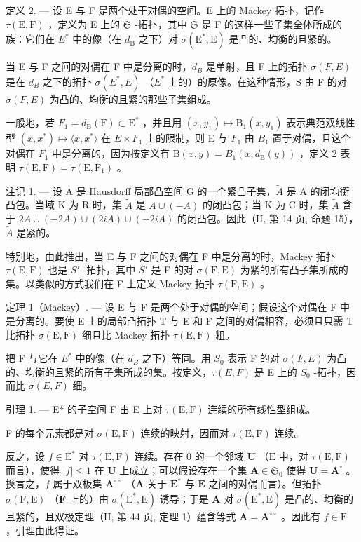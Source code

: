 定义 2. --- 设 E 与 F 是两个处于对偶的空间。E 上的 Mackey 拓扑，记作 \(\tau(\mathrm{E},\mathrm{F})\) ，定义为 E 上的 \(\mathfrak{S}\) -拓扑，其中 \(\mathfrak{S}\) 是 F 的这样一些子集全体所成的族：它们在 \(E^{*}\) 中的像（在 \(d_{\mathrm{B}}\) 之下）对 \(\sigma(\mathrm{E}^{*},\mathrm{E})\) 是凸的、均衡的且紧的。

当 E 与 F 之间的对偶在 F 中是分离的时，\(d_{B}\) 是单射，且 F 上的拓扑 \(\sigma(F, E)\) 是在 \(d_{B}\) 之下的拓扑 \(\sigma(E^{*}, E)\) （\(E^{*}\) 上的）的原像。在这种情形，S 由 F 的对 \(\sigma(F, E)\) 为凸的、均衡的且紧的那些子集组成。

一般地，若 \(F_{1}=d_{\mathrm{B}}(\mathrm{F})\subset\mathrm{E}^{*}\) ，并且用 \((x,y_{1})\mapsto\mathrm{B}_{1}(x,y_{1})\) 表示典范双线性型 \((x,x^{*})\mapsto\langle x,x^{*}\rangle\) 在 \(E\times F_{1}\) 上的限制，则 E 与 \(F_{1}\) 由 \(B_{1}\) 置于对偶，且这个对偶在 \(F_{1}\) 中是分离的，因为按定义有 \(\mathrm{B}(x,y)=B_{1}(x,d_{\mathrm{B}}(y))\) ，定义 2 表明 \(\tau(\mathrm{E},\mathrm{F})=\tau(\mathrm{E},\mathrm{F}_{1})\) 。

注记 1. --- 设 A 是 Hausdorff 局部凸空间 G 的一个紧凸子集，\(\tilde{A}\) 是 A 的闭均衡凸包。当域 K 为 R 时，集 \(\tilde{A}\) 是 \(A \cup (-A)\) 的闭凸包；当 K 为 C 时，集 \(\tilde{A}\) 含于 \(2A \cup (-2A) \cup (2iA) \cup (-2iA)\) 的闭凸包。因此（II, 第 14 页, 命题 15），\(\tilde{A}\) 是紧的。

特别地，由此推出，当 E 与 F 之间的对偶在 F 中是分离的时，Mackey 拓扑 \(\tau(\mathrm{E},\mathrm{F})\) 也是 \(S'\) -拓扑，其中 \(S'\) 是 F 的对 \(\sigma(\mathrm{F},\mathrm{E})\) 为紧的所有凸子集所成的集。以类似的方式我们在 F 上定义 Mackey 拓扑 \(\tau(\mathrm{F},\mathrm{E})\) 。

定理 1（Mackey）. --- 设 E 与 F 是两个处于对偶的空间；假设这个对偶在 F 中是分离的。要使 E 上的局部凸拓扑 T 与 E 和 F 之间的对偶相容，必须且只需 T 比拓扑 \(\sigma(\mathrm{E},\mathrm{F})\) 细且比 Mackey 拓扑 \(\tau(\mathrm{E},\mathrm{F})\) 粗。

把 F 与它在 \(E^{*}\) 中的像（在 \(d_{B}\) 之下）等同。用 \(S_{0}\) 表示 F 的对 \(\sigma(F, E)\) 为凸的、均衡的且紧的所有子集所成的集。按定义，\(\tau(E, F)\) 是 E 上的 \(S_{0}\) -拓扑，因而比 \(\sigma(E, F)\) 细。

引理 1. --- E* 的子空间 F 由 E 上对 \(\tau(\mathrm{E},\mathrm{F})\) 连续的所有线性型组成。

F 的每个元素都是对 \(\sigma(\mathrm{E},\mathrm{F})\) 连续的映射，因而对 \(\tau(\mathrm{E},\mathrm{F})\) 连续。

反之，设 \(f \in \mathrm{E}^*\) 对 \(\tau(\mathrm{E}, \mathrm{F})\) 连续。存在 0 的一个邻域 \(\mathbf{U}\) （\(\mathrm{E}\) 中，对 \(\tau(\mathrm{E}, \mathrm{F})\) 而言），使得 \(|f| \leqslant 1\) 在 \(\mathbf{U}\) 上成立；可以假设存在一个集 \(\mathbf{A} \in \mathfrak{S}_0\) 使得 \(\mathbf{U} = \mathbf{A}^\circ\) 。换言之，\(f\) 属于双极集 \(\mathbf{A}^{\circ\circ}\) （\(\mathbf{A}\) 关于 \(\mathbf{E}^*\) 与 \(\mathbf{E}\) 之间的对偶而言）。但拓扑 \(\sigma(\mathrm{F}, \mathrm{E})\) （\(\mathbf{F}\) 上的）由 \(\sigma(\mathrm{E}^*, \mathrm{E})\) 诱导；于是 \(\mathbf{A}\) 对 \(\sigma(\mathrm{E}^*, \mathrm{E})\) 是凸的、均衡的且紧的，且双极定理（II, 第 44 页, 定理 1）蕴含等式 \(\mathbf{A} = \mathbf{A}^{\circ\circ}\) 。因此有 \(f \in \mathrm{F}\) ，引理由此得证。

